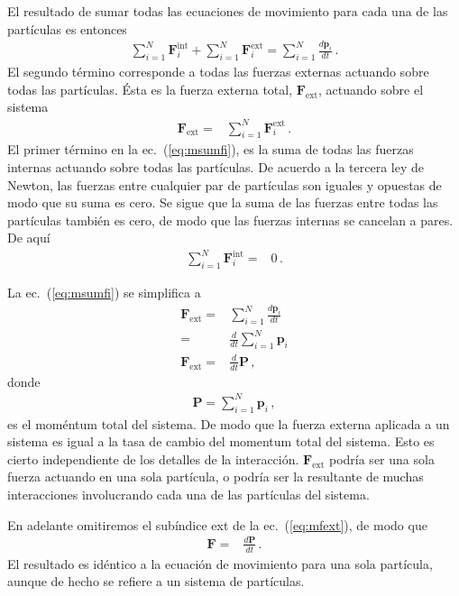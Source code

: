 El resultado de sumar todas las ecuaciones de movimiento para cada una de las partículas es entonces
\begin{align}
  \label{eq:msumfi}
  \sum_{i=1}^N  \mathbf{F}_i^{\text{int}}+\sum_{i=1}^N\mathbf{F}_i^{\text{ext}}=\sum_{i=1}^N \frac{d\mathbf{p}_i}{dt}\,.
\end{align}
El segundo término corresponde a todas las fuerzas externas actuando sobre todas las partículas. Ésta es la fuerza externa total, $\mathbf{F}_{\text{ext}}$, actuando sobre el sistema
\begin{align}
 \mathbf{F}_{\text{ext}}=& \sum_{i=1}^N\mathbf{F}_i^{\text{ext}}\,.
\end{align}
El primer término en la ec.~(\ref{eq:msumfi}), es la suma de todas las fuerzas internas actuando sobre todas las partículas. De acuerdo a la tercera ley de Newton, las fuerzas entre cualquier  par de partículas son iguales y opuestas de modo que su suma es cero. Se sigue que la suma de las fuerzas entre todas las partículas también es cero, de modo que las fuerzas internas se cancelan a pares. De aquí
\begin{align}
\sum_{i=1}^N  \mathbf{F}_i^{\text{int}}=&0\,.  
\end{align}

La ec.~(\ref{eq:msumfi}) se simplifica a
\begin{align}
  \label{eq:mfext}
  \mathbf{F}_{\text{ext}}=&\sum_{i=1}^N \frac{d\mathbf{p}_i}{dt}\nonumber\\
  =& \frac{d}{dt}\sum_{i=1}^N\mathbf{p}_i\nonumber\\
 \mathbf{F}_{\text{ext}} =& \frac{d}{dt}\mathbf{P}\,,
\end{align}
donde
\begin{align}
  \mathbf{P}=\sum_{i=1}^N\mathbf{p}_i\,,
\end{align}
es el moméntum total del sistema. De modo que la fuerza externa
aplicada a un sistema es igual a la tasa de cambio del momentum total del sistema. Esto es cierto independiente de los detalles de la interacción. $\mathbf{F}_{\text{ext}}$ podría ser una sola fuerza actuando en una sola partícula, o podría ser la resultante de muchas interacciones involucrando cada una de las partículas del sistema.

En adelante omitiremos el subíndice ext de la ec.~(\ref{eq:mfext}), de modo que
\begin{align}
  \label{eq:mfdpdt}
  \mathbf{F}=&\frac{d\mathbf{P}}{dt}\,.
\end{align}
El resultado es idéntico a la ecuación de movimiento para una sola partícula, aunque de hecho se refiere a un sistema de partículas. 


